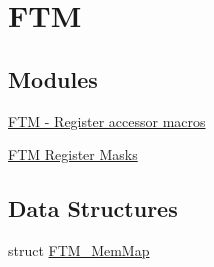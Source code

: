\hypertarget{group___f_t_m___peripheral}{}\section{F\+T\+M}
\label{group___f_t_m___peripheral}
\subsection*{Modules}
\begin{DoxyCompactItemize}
\item 
\hyperlink{group___f_t_m___register___accessor___macros}{F\+T\+M -\/ Register accessor macros}
\item 
\hyperlink{group___f_t_m___register___masks}{F\+T\+M Register Masks}
\end{DoxyCompactItemize}
\subsection*{Data Structures}
\begin{DoxyCompactItemize}
\item 
struct \hyperlink{struct_f_t_m___mem_map}{F\+T\+M\+\_\+\+Mem\+Map}
\end{DoxyCompactItemize}
